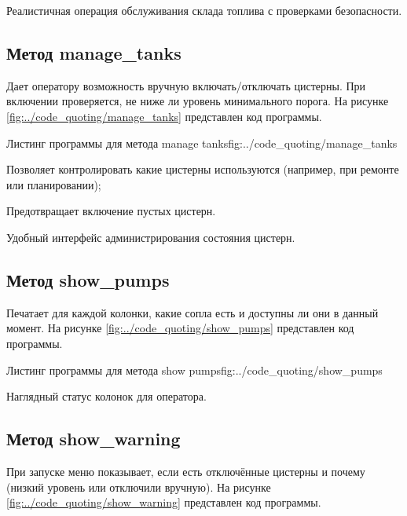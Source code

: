 \documentclass{vvsu}
\begin{document}
  Реалистичная операция обслуживания склада топлива с проверками безопасности.


\subsection{Метод manage\_tanks}
  Дает оператору возможность вручную включать/отключать цистерны. При включении проверяется, не ниже ли уровень минимального порога.
  На рисунке \ref{fig:../code_quoting/manage_tanks} представлен код программы.

\begin{vvsu_figure}{Листинг программы для метода manage tanks}{fig:../code_quoting/manage_tanks}
  \begin{minipage}{.75\textwidth}
    
  \end{minipage}
\end{vvsu_figure}
\begin{vvsu_itemize}
  \item Позволяет контролировать какие цистерны используются (например, при ремонте или планировании);
  \item Предотвращает включение пустых цистерн.
\end{vvsu_itemize}

  Удобный интерфейс администрирования состояния цистерн.


\subsection{Метод show\_pumps}
  Печатает для каждой колонки, какие сопла есть и доступны ли они в данный момент.
  На рисунке \ref{fig:../code_quoting/show_pumps} представлен код программы.

\begin{vvsu_figure}{Листинг программы для метода show pumps}{fig:../code_quoting/show_pumps}
  \begin{minipage}{.75\textwidth}
    
  \end{minipage}
\end{vvsu_figure}

  Наглядный статус колонок для оператора.


\subsection{Метод show\_warning}
  При запуске меню показывает, если есть отключённые цистерны и почему (низкий уровень или отключили вручную).
  На рисунке \ref{fig:../code_quoting/show_warning} представлен код программы.
\end{document}
